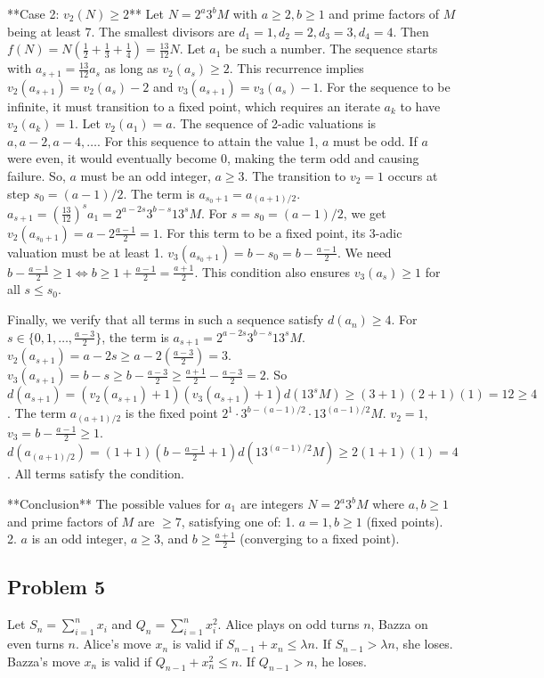 \documentclass[12pt]{article}
\begin{document}
**Case 2: $v_2(N) \ge 2$**
Let $N = 2^a 3^b M$ with $a \ge 2, b \ge 1$ and prime factors of $M$ being at least 7. The smallest divisors are $d_1=1, d_2=2, d_3=3, d_4=4$.
Then $f(N) = N\left(\frac{1}{2}+\frac{1}{3}+\frac{1}{4}\right) = \frac{13}{12}N$.
Let $a_1$ be such a number. The sequence starts with $a_{s+1} = \frac{13}{12}a_s$ as long as $v_2(a_s) \ge 2$.
This recurrence implies $v_2(a_{s+1})=v_2(a_s)-2$ and $v_3(a_{s+1})=v_3(a_s)-1$. For the sequence to be infinite, it must transition to a fixed point, which requires an iterate $a_k$ to have $v_2(a_k)=1$.
Let $v_2(a_1)=a$. The sequence of 2-adic valuations is $a, a-2, a-4, \dots$. For this sequence to attain the value 1, $a$ must be odd. If $a$ were even, it would eventually become 0, making the term odd and causing failure. So, $a$ must be an odd integer, $a \ge 3$.
The transition to $v_2=1$ occurs at step $s_0 = (a-1)/2$. The term is $a_{s_0+1} = a_{(a+1)/2}$.
$a_{s+1} = \left(\frac{13}{12}\right)^s a_1 = 2^{a-2s} 3^{b-s} 13^s M$.
For $s=s_0=(a-1)/2$, we get $v_2(a_{s_0+1}) = a-2\frac{a-1}{2}=1$.
For this term to be a fixed point, its 3-adic valuation must be at least 1.
$v_3(a_{s_0+1}) = b-s_0 = b-\frac{a-1}{2}$. We need $b-\frac{a-1}{2} \ge 1 \iff b \ge 1+\frac{a-1}{2} = \frac{a+1}{2}$.
This condition also ensures $v_3(a_s) \ge 1$ for all $s \le s_0$.

Finally, we verify that all terms in such a sequence satisfy $d(a_n) \ge 4$.
For $s \in \{0, 1, \dots, \frac{a-3}{2}\}$, the term is $a_{s+1} = 2^{a-2s} 3^{b-s} 13^s M$.
$v_2(a_{s+1}) = a-2s \ge a-2(\frac{a-3}{2}) = 3$.
$v_3(a_{s+1}) = b-s \ge b-\frac{a-3}{2} \ge \frac{a+1}{2}-\frac{a-3}{2} = 2$.
So $d(a_{s+1}) = (v_2(a_{s+1})+1)(v_3(a_{s+1})+1)d(13^s M) \ge (3+1)(2+1)(1) = 12 \ge 4$.
The term $a_{(a+1)/2}$ is the fixed point $2^1 \cdot 3^{b-(a-1)/2} \cdot 13^{(a-1)/2} M$.
$v_2=1$, $v_3 = b-\frac{a-1}{2} \ge 1$.
$d(a_{(a+1)/2}) = (1+1)(b-\frac{a-1}{2}+1)d(13^{(a-1)/2}M) \ge 2(1+1)(1) = 4$.
All terms satisfy the condition.

**Conclusion**
The possible values for $a_1$ are integers $N=2^a 3^b M$ where $a,b \ge 1$ and prime factors of $M$ are $\ge 7$, satisfying one of:
1.  $a=1, b \ge 1$ (fixed points).
2.  $a$ is an odd integer, $a \ge 3$, and $b \ge \frac{a+1}{2}$ (converging to a fixed point).

\subsection{Problem 5}

Let $S_n = \sum_{i=1}^n x_i$ and $Q_n = \sum_{i=1}^n x_i^2$.
Alice plays on odd turns $n$, Bazza on even turns $n$.
Alice's move $x_n$ is valid if $S_{n-1}+x_n \le \lambda n$. If $S_{n-1} > \lambda n$, she loses.
Bazza's move $x_n$ is valid if $Q_{n-1}+x_n^2 \le n$. If $Q_{n-1} > n$, he loses.
\end{document}
